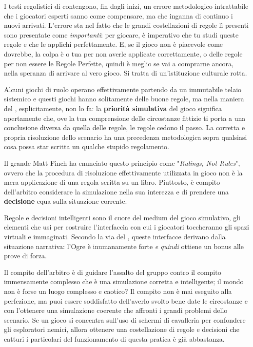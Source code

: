 
I testi regolistici di \dnd{} contengono, fin dagli inizi, un errore metodologico intrattabile che i giocatori esperti sanno come compensare, ma che inganna di continuo i nuovi arrivati. L'errore sta nel fatto che le grandi costellazioni di regole lì presenti sono presentate come \textit{importanti}: per giocare, è imperativo che tu studi queste regole e che le applichi perfettamente. E, se il gioco non è piacevole come dovrebbe, la colpa è o tua per non averle applicate correttamente, o delle regole per non essere le Regole Perfette, quindi è meglio se vai a comprarne ancora, nella speranza di arrivare al vero gioco. Si tratta di un'istituzione culturale rotta.

Alcuni giochi di ruolo operano effettivamente partendo da un immutabile telaio sistemico e questi giochi hanno solitamente delle buone regole, ma \dnd{} nella maniera del , esplicitamente, non lo fa: la \textbf{priorità simulativa} del gioco significa apertamente che, ove la tua comprensione delle circostanze fittizie ti porta a una conclusione diversa da quella delle regole, le regole cedono il passo. La corretta e propria risoluzione dello scenario ha una precedenza metodologica sopra qualsiasi cosa possa star scritta un qualche stupido regolamento.

Il grande Matt Finch ha enunciato questo principio come "\textit{Rulings, Not Rules}", ovvero che la procedura di risoluzione effettivamente utilizzata in gioco non è la mera applicazione di una regola scritta su un libro. Piuttosto, è compito dell'arbitro considerare la simulazione nella sua interezza e di prendere una \textbf{decisione} equa sulla situazione corrente.

Regole e decisioni intelligenti sono il cuore del medium del gioco simulativo, gli elementi che usi per costruire l'interfaccia con cui i giocatori toccheranno gli spazi virtuali e immaginati. Secondo la via del , queste interfacce derivano dalla situazione narrativa: l'Ogre è inumanamente forte \textit{e quindi} ottiene un bonus alle prove di forza.

Il compito dell'arbitro è di guidare l'assalto del gruppo contro il compito immensamente complesso che è una simulazione corretta e intelligente; il mondo non è forse un luogo complesso e caotico? Il compito non è mai eseguito alla perfezione, ma puoi essere soddisfatto dell'averlo svolto bene date le circostanze e con l'ottenere una simulazione coerente che affronti i grandi problemi dello scenario. Se un gioco si concentra sull'uso di schermi di cavalleria per confondere gli esploratori nemici, allora ottenere una costellazione di regole e decisioni che catturi i particolari del funzionamento di questa pratica è già abbastanza.

